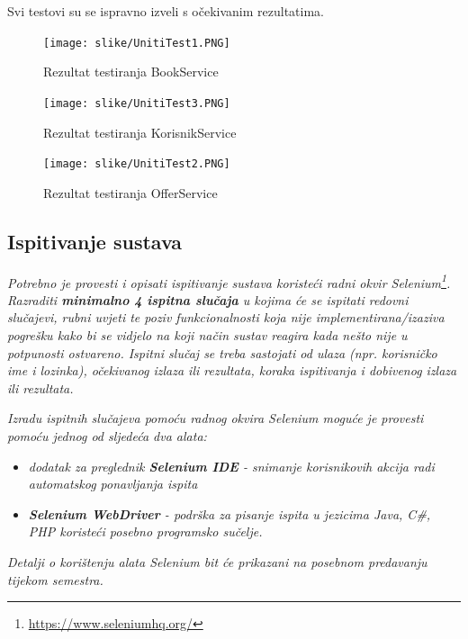             Svi testovi su se ispravno izveli s očekivanim rezultatima. 
            \eject
			
			
			\begin{figure}[H]
				\texttt{[image: slike/UnitiTest1.PNG]} %
				\centering
				\caption{Rezultat testiranja BookService }
				\label{fig:BookService1}
			\end{figure}
			
			\eject
            \eject
			
			
			\begin{figure}[H]
				\texttt{[image: slike/UnitiTest3.PNG]} %
				\centering
				\caption{Rezultat testiranja KorisnikService }
				\label{fig:KorisnikService1}
			\end{figure}
			
			\eject
            \eject
			
			
			\begin{figure}[H]
				\texttt{[image: slike/UnitiTest2.PNG]} %
				\centering
				\caption{Rezultat testiranja OfferService}
				\label{fig:OfferService1}
			\end{figure}
			
			\eject
			
			
			
			
			
			\subsection{Ispitivanje sustava}
			
			 \textit{Potrebno je provesti i opisati ispitivanje sustava koristeći radni okvir Selenium\footnote{\url{https://www.seleniumhq.org/}}. Razraditi \textbf{minimalno 4 ispitna slučaja} u kojima će se ispitati redovni slučajevi, rubni uvjeti te poziv funkcionalnosti koja nije implementirana/izaziva pogrešku kako bi se vidjelo na koji način sustav reagira kada nešto nije u potpunosti ostvareno. Ispitni slučaj se treba sastojati od ulaza (npr. korisničko ime i lozinka), očekivanog izlaza ili rezultata, koraka ispitivanja i dobivenog izlaza ili rezultata.\\ }
			 
			 \textit{Izradu ispitnih slučajeva pomoću radnog okvira Selenium moguće je provesti pomoću jednog od sljedeća dva alata:}
			 \begin{itemize}
			 	\item \textit{dodatak za preglednik \textbf{Selenium IDE} - snimanje korisnikovih akcija radi automatskog ponavljanja ispita	}
			 	\item \textit{\textbf{Selenium WebDriver} - podrška za pisanje ispita u jezicima Java, C\#, PHP koristeći posebno programsko sučelje.}
			 \end{itemize}
		 	\textit{Detalji o korištenju alata Selenium bit će prikazani na posebnom predavanju tijekom semestra.}
			
